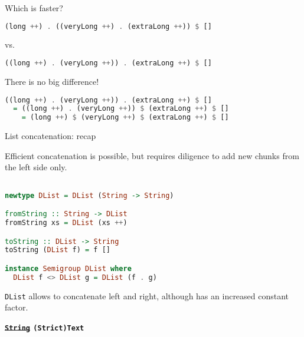 \documentclass[handout]{beamer}
\begin{document}
\begin{frame}[fragile]{Which is faster?}

\begin{lstlisting}[language=Haskell]
(long ++) . ((veryLong ++) . (extraLong ++)) $ []
\end{lstlisting}
vs.
\begin{lstlisting}[language=Haskell]
((long ++) . (veryLong ++)) . (extraLong ++) $ []
\end{lstlisting}


\pause

\bigskip
\bigskip
\bigskip

There is no big difference!

\begin{lstlisting}[language=Haskell]
((long ++) . (veryLong ++)) . (extraLong ++) $ []
  = ((long ++) . (veryLong ++)) $ (extraLong ++) $ []
    = (long ++) $ (veryLong ++) $ (extraLong ++) $ []
\end{lstlisting}

\end{frame}

\begin{frame}[fragile]{List concatenation: recap}

Efficient concatenation is possible, but requires diligence
        to add new chunks from the left side only.

\begin{lstlisting}[language=Haskell]

newtype DList = DList (String -> String)

fromString :: String -> DList
fromString xs = DList (xs ++)

toString :: DList -> String
toString (DList f) = f []

instance Semigroup DList where
  DList f <> DList g = DList (f . g)
\end{lstlisting}

\bigskip

{\tt DList} allows to concatenate left and right,
        although has an increased constant factor.

\end{frame}

\begin{frame}[fragile]


\begin{block}{}
\bigskip
\centerline{\Huge\bf \color{ukraine-blue} \st{\tt String} {\tt (Strict)Text}}
\bigskip
\end{block}

\end{frame}
\end{document}
